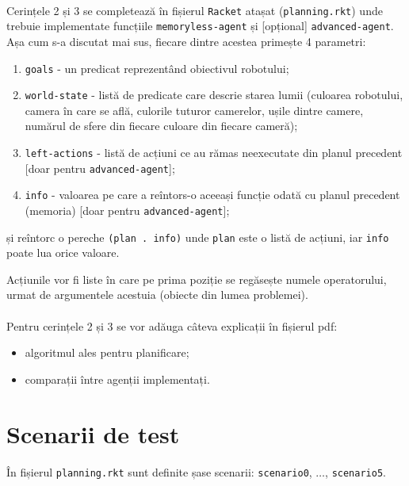 \documentclass[12pt]{article}
\newcommand{\repr}[1]{{\color{sapphire}\texttt{#1}}}
\newcommand{\racket}[0]{{\color{burntorange}\texttt{Racket}} }
\begin{document}
\paragraph{}

Cerințele 2 și 3 se completează în fișierul \racket atașat
(\texttt{planning.rkt}) unde trebuie implementate funcțiile
\repr{memoryless-agent} și [opțional] \repr{advanced-agent}. Așa
cum s-a discutat mai sus, fiecare dintre acestea primește 4 parametri:
\begin{enumerate}
\item \repr{goals} - un predicat reprezentând obiectivul robotului;
\item \repr{world-state} - listă de predicate care descrie starea
  lumii (culoarea robotului, camera în care se află, culorile tuturor
  camerelor, ușile dintre camere, numărul de sfere din fiecare culoare
  din fiecare cameră);
\item \repr{left-actions} - listă de acțiuni ce au rămas neexecutate
  din planul precedent [doar pentru \repr{advanced-agent}];
\item \repr{info} - valoarea pe care a reîntors-o aceeași funcție
  odată cu planul precedent (memoria) [doar pentru
  \repr{advanced-agent}];
\end{enumerate} și reîntorc o pereche \repr{(plan . info)} unde
\repr{plan} este o listă de acțiuni, iar \repr{info} poate lua orice
valoare.

Acțiunile vor fi liste în care pe prima poziție se regăsește numele
operatorului, urmat de argumentele acestuia (obiecte din lumea
problemei).

\paragraph{}

Pentru cerințele 2 și 3 se vor adăuga câteva explicații în fișierul
pdf:
\begin{itemize}
\item algoritmul ales pentru planificare;
\item comparații între agenții implementați.
\end{itemize}

\section{Scenarii de test}
\label{sec:test}

În fișierul \texttt{planning.rkt} sunt definite șase scenarii:
\repr{scenario0}, $\ldots$, \repr{scenario5}.
\end{document}
